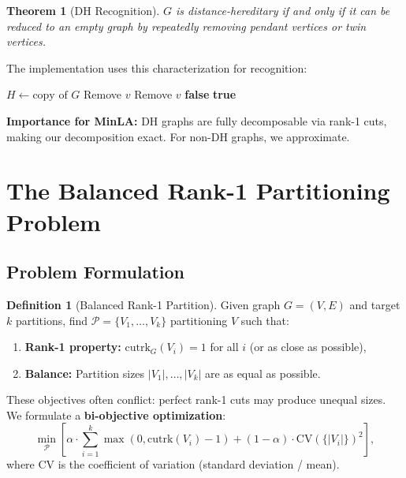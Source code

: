 \documentclass[11pt,a4paper]{article}
\theoremstyle{definition}
\newtheorem{definition}{Definition}[section]
\theoremstyle{plain}
\newtheorem{theorem}{Theorem}[section]
\theoremstyle{remark}
\newcommand{\cutrk}{\mathrm{cutrk}}
\newcommand{\CV}{\mathrm{CV}}
\begin{document}
\begin{theorem}[DH Recognition]
$G$ is distance-hereditary if and only if it can be reduced to an empty
graph by repeatedly removing pendant vertices or twin vertices.
\end{theorem}

The implementation uses this characterization for recognition:

\begin{algorithm}[H]
\caption{Is Distance-Hereditary}
\begin{algorithmic}[1]
  \State $H \gets \text{copy of } G$
      \State Remove $v$
      \State Remove $v$
    \Else
      \State \Return \textbf{false}
    \EndIf
  \EndWhile
  \State \Return \textbf{true}
\EndProcedure
\end{algorithmic}
\end{algorithm}

\textbf{Importance for MinLA:} DH graphs are fully decomposable via rank-1
cuts, making our decomposition exact. For non-DH graphs, we approximate.

\section{The Balanced Rank-1 Partitioning Problem}

\subsection{Problem Formulation}

\begin{definition}[Balanced Rank-1 Partition]
Given graph $G = (V, E)$ and target $k$ partitions, find
$\mathcal{P} = \{V_1, \ldots, V_k\}$ partitioning $V$ such that:
\begin{enumerate}
  \item \textbf{Rank-1 property:} $\cutrk_G(V_i) = 1$ for all $i$ (or as
        close as possible),
  \item \textbf{Balance:} Partition sizes $|V_1|, \ldots, |V_k|$ are as
        equal as possible.
\end{enumerate}
\end{definition}

These objectives often conflict: perfect rank-1 cuts may produce unequal
sizes. We formulate a \textbf{bi-objective optimization}:
\begin{equation}
  \min_{\mathcal{P}} \left[
    \alpha \cdot \sum_{i=1}^k \max(0, \cutrk(V_i) - 1)
    + (1 - \alpha) \cdot \CV(\{|V_i|\})^2
  \right],
  \label{eq:joint}
\end{equation}
where $\CV$ is the coefficient of variation (standard deviation / mean).
\end{document}
